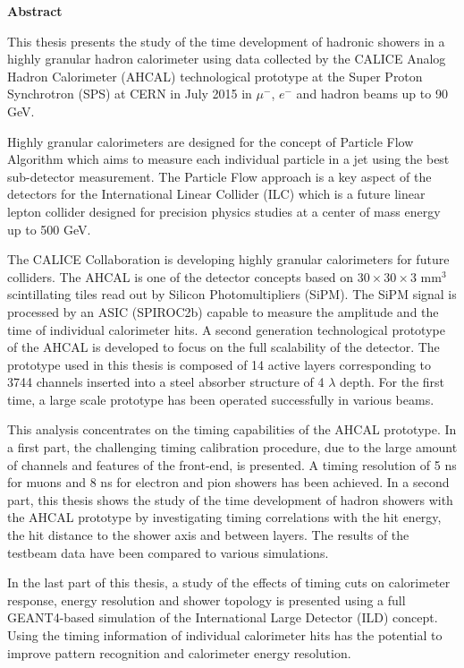 \cleardoublepage
{}
{}

\thispagestyle{empty}
\begin{center}
{\bf Abstract}
\end{center}

This thesis presents the study of the time development of hadronic showers in a highly granular hadron calorimeter using data collected by the CALICE Analog Hadron Calorimeter (AHCAL) technological prototype at the Super Proton Synchrotron (SPS) at CERN in July 2015 in $\mu^-$, $e^-$ and hadron beams up to 90 GeV.

Highly granular calorimeters are designed for the concept of Particle Flow Algorithm which aims to measure each individual particle in a jet using the best sub-detector measurement. The Particle Flow approach is a key aspect of the detectors for the International Linear Collider (ILC) which is a future linear lepton collider designed for precision physics studies at a center of mass energy up to 500 GeV.

The CALICE Collaboration is developing highly granular calorimeters for future colliders. The AHCAL is one of the detector concepts based on $30\times30\times3$ mm$^3$ scintillating tiles read out by Silicon Photomultipliers (SiPM). The SiPM signal is processed by an ASIC (SPIROC2b) capable to measure the amplitude and the time of individual calorimeter hits. A second generation technological prototype of the AHCAL is developed to focus on the full scalability of the detector. The prototype used in this thesis is composed of 14 active layers corresponding to 3744 channels inserted into a steel absorber structure of 4 $\lambda$ depth. For the first time, a large scale prototype has been operated successfully in various beams.

This analysis concentrates on the timing capabilities of the AHCAL prototype. In a first part, the challenging timing calibration procedure, due to the large amount of channels and features of the front-end, is presented. A timing resolution of 5 ns for muons and 8 ns for electron and pion showers has been achieved. In a second part, this thesis shows the study of the time development of hadron showers with the AHCAL prototype by investigating timing correlations with the hit energy, the hit distance to the shower axis and between layers. The results of the testbeam data have been compared to various simulations.

In the last part of this thesis, a study of the effects of timing cuts on calorimeter response, energy resolution and shower topology is presented using a full GEANT4-based simulation of the International Large Detector (ILD) concept. Using the timing information of individual calorimeter hits has the potential to improve pattern recognition and calorimeter energy resolution.

